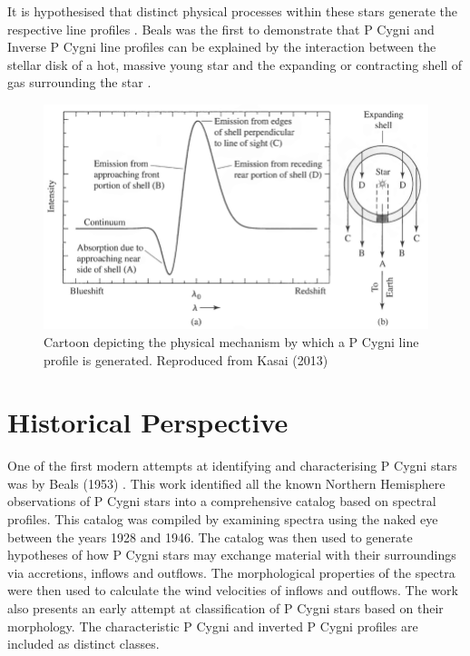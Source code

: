 It is hypothesised that distinct physical processes within these stars generate the respective line profiles \cite{hou2016catalog}. Beals was the first to demonstrate that P Cygni and Inverse P Cygni line profiles can be explained by the interaction between the stellar disk of a hot, massive young star and the expanding or contracting shell of gas surrounding the star \cite{1953PDAO....9....1B}. 

\begin{figure}[h]
\centering
\includegraphics[scale=.40]{figures/expandingpcygni.png}
\caption{Cartoon depicting the physical mechanism by which a P Cygni line profile is generated. Reproduced from Kasai (2013)\cite{kasai2013type}}
\end{figure}

\section{Historical Perspective}

One of the first modern attempts at identifying and characterising P Cygni stars was by Beals (1953) \cite{1953PDAO....9....1B}. This work identified all the known Northern Hemisphere observations of P Cygni stars into a comprehensive catalog based on spectral profiles. This catalog was compiled by examining spectra using the naked eye between the years 1928 and 1946. The catalog was then used to generate hypotheses of how P Cygni stars may exchange material with their surroundings via accretions, inflows and outflows. The morphological properties of the spectra were then used to calculate the wind velocities of inflows and outflows. The work also presents an early attempt at classification of P Cygni stars based on their morphology. The characteristic P Cygni and inverted P Cygni profiles are included as distinct classes.




